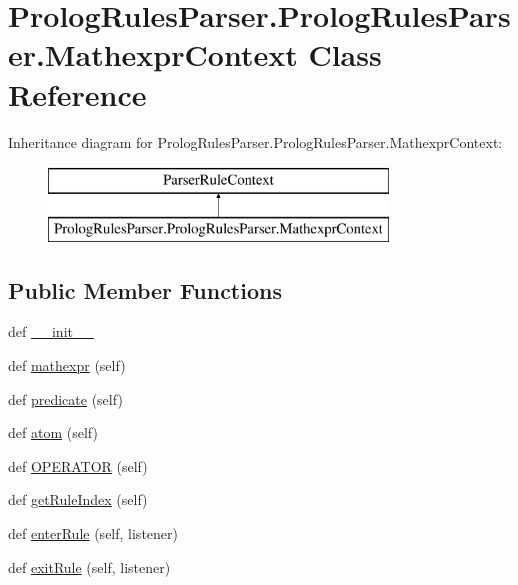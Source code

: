 \hypertarget{class_prolog_rules_parser_1_1_prolog_rules_parser_1_1_mathexpr_context}{}\section{Prolog\+Rules\+Parser.\+Prolog\+Rules\+Parser.\+Mathexpr\+Context Class Reference}
\label{class_prolog_rules_parser_1_1_prolog_rules_parser_1_1_mathexpr_context}
Inheritance diagram for Prolog\+Rules\+Parser.\+Prolog\+Rules\+Parser.\+Mathexpr\+Context\+:\begin{figure}[H]
\begin{center}
\leavevmode
\includegraphics[height=2.000000cm]{class_prolog_rules_parser_1_1_prolog_rules_parser_1_1_mathexpr_context}
\end{center}
\end{figure}
\subsection*{Public Member Functions}
\begin{DoxyCompactItemize}
\item 
def \hyperlink{class_prolog_rules_parser_1_1_prolog_rules_parser_1_1_mathexpr_context_ac65feb745a3d272c76c7b02744499965}{\+\_\+\+\_\+init\+\_\+\+\_\+}
\item 
def \hyperlink{class_prolog_rules_parser_1_1_prolog_rules_parser_1_1_mathexpr_context_a58091aa625a7633b64a3b75ea41051d2}{mathexpr} (self)
\item 
def \hyperlink{class_prolog_rules_parser_1_1_prolog_rules_parser_1_1_mathexpr_context_a739b415e126861043fd4b0cb7fdbeda9}{predicate} (self)
\item 
def \hyperlink{class_prolog_rules_parser_1_1_prolog_rules_parser_1_1_mathexpr_context_a7c11e2387b7216f3d93597d044f9fcba}{atom} (self)
\item 
def \hyperlink{class_prolog_rules_parser_1_1_prolog_rules_parser_1_1_mathexpr_context_a24b387aace761d5189e3fe80e3ef7653}{O\+P\+E\+R\+A\+T\+O\+R} (self)
\item 
def \hyperlink{class_prolog_rules_parser_1_1_prolog_rules_parser_1_1_mathexpr_context_a49b6d329e8fead29bb8e4deda9ace614}{get\+Rule\+Index} (self)
\item 
def \hyperlink{class_prolog_rules_parser_1_1_prolog_rules_parser_1_1_mathexpr_context_a305bcd3766e155aa9fecea8b4bce2005}{enter\+Rule} (self, listener)
\item 
def \hyperlink{class_prolog_rules_parser_1_1_prolog_rules_parser_1_1_mathexpr_context_ab0be52a445a692e94faac0704928053b}{exit\+Rule} (self, listener)
\end{DoxyCompactItemize}
